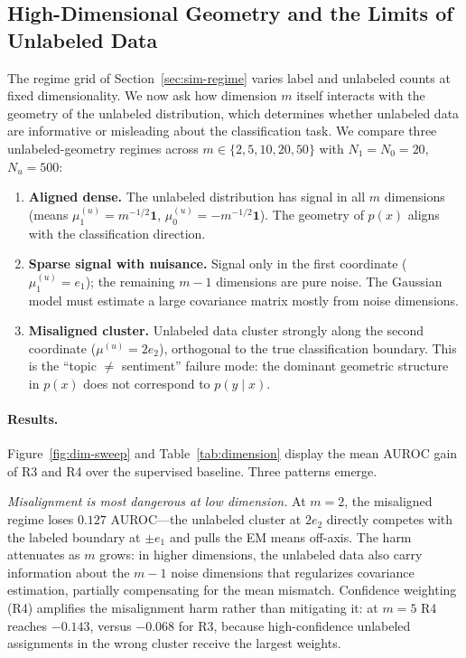 \documentclass[11pt]{article}
\theoremstyle{definition}
\begin{document}
\subsection{High-Dimensional Geometry and the Limits of Unlabeled Data}
\label{sec:sim-dimension}

The regime grid of Section~\ref{sec:sim-regime} varies label and unlabeled
counts at fixed dimensionality.
We now ask how dimension \(m\) itself interacts with the geometry of the
unlabeled distribution, which determines whether unlabeled data are
informative or misleading about the classification task.
We compare three unlabeled-geometry regimes across
\(m\in\{2,5,10,20,50\}\) with \(N_1=N_0=20\), \(N_u=500\):

\begin{enumerate}[leftmargin=1.5em,label=\textbf{(\alph*)}]
\item \textbf{Aligned dense.}
      The unlabeled distribution has signal in all \(m\) dimensions
      (means \(\mu_{1}^{(u)} = m^{-1/2}\mathbf{1}\),
      \(\mu_{0}^{(u)} = -m^{-1/2}\mathbf{1}\)).
      The geometry of \(p(x)\) aligns with the classification direction.

\item \textbf{Sparse signal with nuisance.}
      Signal only in the first coordinate (\(\mu_1^{(u)}=e_1\));
      the remaining \(m-1\) dimensions are pure noise.
      The Gaussian model must estimate a large covariance matrix mostly
      from noise dimensions.

\item \textbf{Misaligned cluster.}
      Unlabeled data cluster strongly along the second coordinate
      (\(\mu^{(u)} = 2e_2\)), orthogonal to the true classification boundary.
      This is the ``topic \(\neq\) sentiment'' failure mode: the dominant
      geometric structure in \(p(x)\) does not correspond to \(p(y\mid x)\).
\end{enumerate}

\paragraph{Results.}
Figure~\ref{fig:dim-sweep} and Table~\ref{tab:dimension} display the mean
AUROC gain of R3 and R4 over the supervised baseline.
Three patterns emerge.

\emph{Misalignment is most dangerous at low dimension.}
At \(m=2\), the misaligned regime loses \(0.127\) AUROC---the unlabeled
cluster at \(2e_2\) directly competes with the labeled boundary at
\(\pm e_1\) and pulls the EM means off-axis.
The harm attenuates as \(m\) grows: in higher dimensions, the unlabeled
data also carry information about the \(m-1\) noise dimensions that
regularizes covariance estimation, partially compensating for the mean
mismatch.
Confidence weighting (R4) amplifies the misalignment harm rather than
mitigating it: at \(m=5\) R4 reaches \(-0.143\), versus \(-0.068\) for R3,
because high-confidence unlabeled assignments in the wrong cluster
receive the largest weights.
\end{document}
